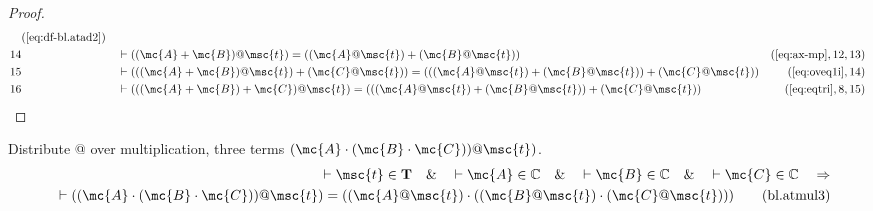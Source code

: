 \begin{proof}
\begin{align}
     &(\mbox{\ref{eq:df-bl.atad2}})\notag
  \\ 14 &&  & \vdash ( ( \mc{A} + \mc{B} ) @ \msc{t} ) = ( ( \mc{A} @ \msc{t} ) + ( \mc{B} @
     \msc{t} ) )&(\mbox{\ref{eq:ax-mp}},12,13)\notag
  \\ 15 &&  & \vdash ( ( ( \mc{A} + \mc{B} ) @ \msc{t} ) + ( \mc{C} @ \msc{t} ) ) = ( ( ( \mc{A} @
     \msc{t} ) + ( \mc{B} @ \msc{t} ) ) + ( \mc{C} @ \msc{t} )
     )&(\mbox{\ref{eq:oveq1i}},14)\notag
  \\ 16 &&  & \vdash ( ( ( \mc{A} + \mc{B} ) + \mc{C} ) @ \msc{t} ) = ( ( ( \mc{A} @ \msc{t} ) + (
     \mc{B} @ \msc{t} ) ) + ( \mc{C} @ \msc{t} )
     )&(\mbox{\ref{eq:eqtri}},8,15)\notag
\end{align}
\end{proof}

\begin{lemma} {Distribute @ over multiplication, three
terms} $( \mc{A} \cdot ( \mc{B} \cdot \mc{C} ) ) @ \msc{t} )$.
\begin{align}
\vdash \msc{t} \in \mathbf{T}\quad\&\quad \vdash \mc{A} \in \mathbb{C}\quad\&\quad
    \vdash \mc{B} \in \mathbb{C}\quad\&\quad \vdash \mc{C} \in
    \mathbb{C}\quad\Rightarrow \notag \\
    \quad \vdash ( ( \mc{A} \cdot ( \mc{B} \cdot \mc{C} ) ) @
    \msc{t} ) = ( ( \mc{A} @ \msc{t} ) \cdot ( ( \mc{B} @ \msc{t} ) \cdot ( \mc{C} @ \msc{t} )
    ) )\label{eq:bl.atmul3}\tag{bl.atmul3}
\end{align}
\end{lemma}


